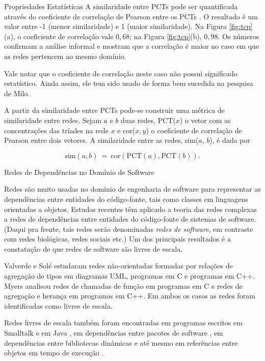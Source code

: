 \begin{section}{Propriedades Estatísticas}
A similaridade entre PCTs pode ser quantificada através do coeficiente de correlação de Pearson entre os PCTs \cite{Milo2004}. O resultado é um valor entre -1 (menor similaridade) e 1 (maior similaridade). Na Figura \ref{fig:tcp}(a), o coeficiente de correlação vale $0,68$; na Figura \ref{fig:tcp}(b), $0,98$. Os números confirmam a análise informal e mostram que a correlação é maior no caso em que as redes pertencem ao mesmo domínio.

Vale notar que o coeficiente de correlação neste caso não possui significado estatístico. Ainda assim, ele tem sido usado de forma bem sucedida na pesquisa de Milo.

A partir da similaridade entre PCTs pode-se construir uma métrica de similaridade entre redes. Sejam $a$ e $b$ duas redes, PCT($x$) o vetor com as concentrações das tríades na rede $x$ e cor($x, y$) o coeficiente de correlação de Pearson entre dois vetores. A similaridade entre as redes, sim($a$, $b$), é dada por

$$
\mathrm{sim}(a, b) ~=~ 
  \mathrm{cor}(\mathrm{PCT}(a), \mathrm{PCT}(b))\mathrm{.}
$$

\end{section}

\begin{section}{Redes de Dependências no Domínio de Software}

	Redes são muito usadas no domínio de engenharia de software para representar as dependências entre entidades do código-fonte, tais como classes em linguagens orientadas a objetos. 
	Estudos recentes têm aplicado a teoria das redes complexas a redes de dependências entre entidades do código-fonte de sistemas de software. 
	(Daqui pra frente, tais redes serão denominadas \emph{redes de software}, em contraste com redes biológicas, redes sociais etc.) Um dos principais resultados é a constatação de que redes de software são livres de escala.
	
	Valverde e Solé \cite{Valverde2003} estudaram redes não-orientadas formadas por relações de agregação de tipos em diagramas UML, programas em C e programas em C++. Myers \cite{Myers2003} analisou redes de chamadas de função em programas em C e redes de agregação e herança em programas em C++. Em ambos os casos as redes foram identificadas como livres de escala. 

	Redes livres de escala também foram encontradas em programas escritos em Smalltalk \cite{Marchesi2004,Concas2007} e em Java \cite{Hyland-Wood2006,Baxter2006,Ichii2008}, em dependências entre pacotes de software \cite{Labelle2004}, em dependências entre bibliotecas dinâmicas \cite{Louridas2008} e até mesmo em referências entre objetos em tempo de execução \cite{Potanin2005}.
\end{section}

